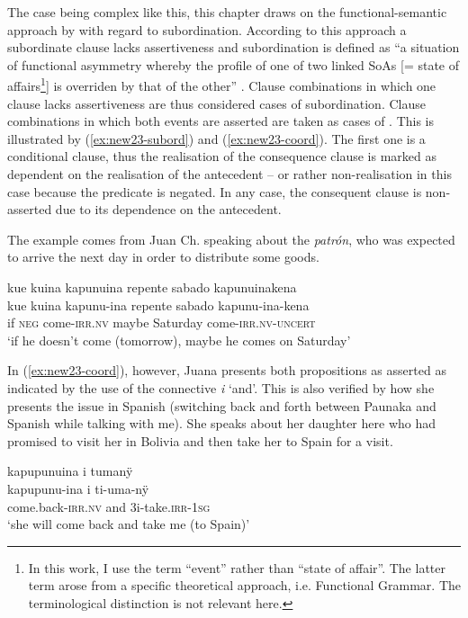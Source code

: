 \hspace*{-1.5pt}The case being complex like this, this chapter draws on the functional-semantic approach by \citet[]{Cristofaro2003} with regard to subordination. According to this approach a subordinate clause lacks assertiveness and subordination is defined as “a situation of functional asymmetry whereby the profile of one of two linked SoAs [= state of affairs\footnote{In this work, I use the term “event” rather than “state of affair”. The latter term arose from a specific theoretical approach, i.e. Functional Grammar. The terminological distinction is not relevant here.}] is overriden by that of the other” \citep[39]{Cristofaro2003}. Clause combinations in which one clause lacks assertiveness are thus considered cases of subordination. Clause combinations in which both events are asserted are taken as cases of . This is illustrated by (\ref{ex:new23-subord}) and (\ref{ex:new23-coord}). The first one is a conditional clause, thus the realisation of the consequence clause is marked as dependent on the realisation of the antecedent – or rather non-realisation in this case because the predicate is negated. In any case, the consequent clause is non-asserted due to its dependence on the antecedent.

The example comes from Juan Ch. speaking about the \textit{patrón}, who was expected to arrive the next day in order to distribute some goods.

\ea\label{ex:new23-subord}
\begingl
\glpreamble kue kuina kapunuina repente sabado kapunuinakena\\
\gla kue kuina kapunu-ina repente sabado kapunu-ina-kena\\
\glb if \textsc{neg} come-\textsc{irr.nv} maybe Saturday come-\textsc{irr.nv}-\textsc{uncert} \\
\glft ‘if he doesn’t come (tomorrow), maybe he comes on Saturday’
\endgl
\trailingcitation{[nxx-p630101g-1.066]}
\xe


In (\ref{ex:new23-coord}), however, Juana presents both propositions as asserted as indicated by the use of the connective \textit{i} ‘and’. This is also verified by how she presents the issue in Spanish (switching back and forth between Paunaka and Spanish while talking with me). She speaks about her daughter here who had promised to visit her in Bolivia and then take her to Spain for a visit.

\ea\label{ex:new23-coord}
\begingl
\glpreamble kapupunuina i tumanÿ\\
\gla kapupunu-ina i ti-uma-nÿ\\
\glb come.back-\textsc{irr.nv} and 3i-take.\textsc{irr}-1\textsc{sg}\\
\glft ‘she will come back and take me (to Spain)’
\endgl
\trailingcitation{[jxx-p110923l-1.258]}
\xe


